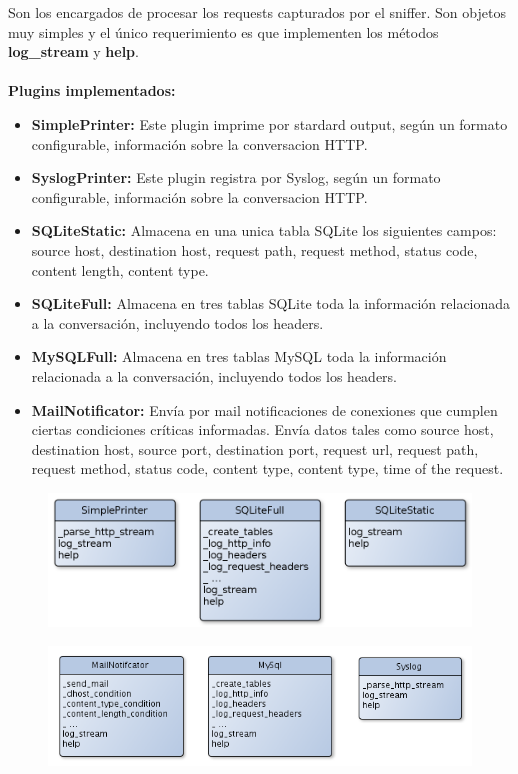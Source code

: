 Son los encargados de procesar los requests capturados por el sniffer. Son objetos muy simples y el único requerimiento es que implementen los métodos \textbf{log\_stream} y \textbf{help}. 
\\\\
\newpage %
\textbf{Plugins implementados:}
\begin{itemize}
	\item \textbf{SimplePrinter:} Este plugin imprime por stardard output, según un formato configurable, información sobre la conversacion HTTP.
	\item \textbf{SyslogPrinter: } Este plugin registra por Syslog, según un formato configurable, información sobre la conversacion HTTP.
	\item \textbf{SQLiteStatic:} Almacena en una unica tabla SQLite los siguientes campos: source host, destination host, request path, request method, status code, content length, content type.
	\item \textbf{SQLiteFull: } Almacena en tres tablas SQLite toda la información relacionada a la conversación, incluyendo todos los headers.
	\item \textbf{MySQLFull: } Almacena en tres tablas MySQL toda la información relacionada a la conversación, incluyendo todos los headers.
	\item \textbf{MailNotificator: } Envía por mail notificaciones de conexiones que cumplen ciertas condiciones críticas informadas. Envía datos tales como source host, destination host, source port, destination port, request url, request path, request method, status code, content type, content type, time of the request.
\end{itemize}

\begin{figure}[hbtp]
    \centering
	\includegraphics[scale=0.40]{img/Plugins1.png} 
\end{figure}

\begin{figure}[hbtp]
    \centering
	\includegraphics[width=\textwidth]{img/Plugins2.png} 
\end{figure}
